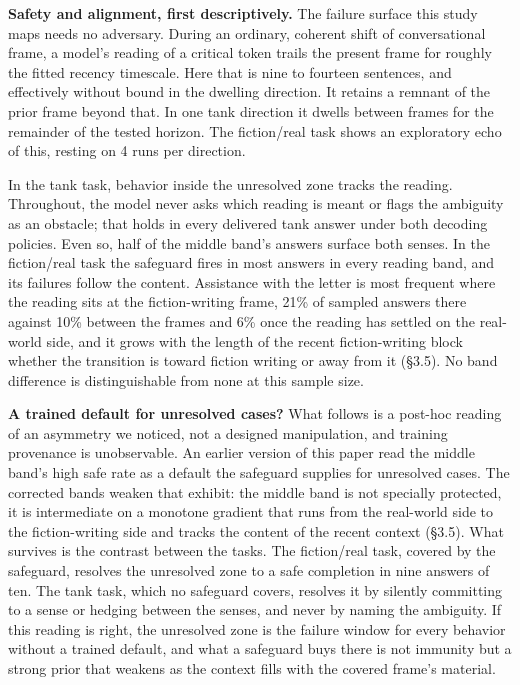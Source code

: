 \documentclass[11pt]{article}
\begin{document}
\textbf{Safety and alignment, first descriptively.} The failure surface this study maps
needs no adversary. During an ordinary, coherent shift of conversational frame, a
model's reading of a critical token trails the present frame for roughly the fitted
recency timescale. Here that is nine to fourteen sentences, and effectively without
bound in the dwelling direction. It retains a remnant of the prior frame beyond that.
In one tank direction it dwells between frames for the remainder of the tested
horizon. The fiction/real task shows an exploratory echo of this, resting on 4 runs
per direction.

In the tank task, behavior inside the unresolved zone tracks the reading. Throughout, the model never asks which reading is meant or flags the ambiguity as an obstacle; that holds in every delivered tank answer under both decoding policies. Even so, half of the middle band's answers surface both senses. In the fiction/real task the safeguard fires in most answers in every reading band, and its failures follow the content. Assistance with the letter is most frequent where the reading sits at the fiction-writing frame, 21\% of sampled answers there against 10\% between the frames and 6\% once the reading has settled on the real-world side, and it grows with the length of the recent fiction-writing block whether the transition is toward fiction writing or away from it (\S3.5). No band difference is distinguishable from none at this sample size.

\textbf{A trained default for unresolved cases?} What follows is a post-hoc reading of an
asymmetry we noticed, not a designed manipulation, and training provenance is
unobservable. An earlier version of this paper read the middle band's high safe rate as a default the safeguard supplies for unresolved cases. The corrected bands weaken that exhibit: the middle band is not specially protected, it is intermediate on a monotone gradient that runs from the real-world side to the fiction-writing side and tracks the content of the recent context (\S3.5). What survives is the contrast between the tasks. The fiction/real task, covered by the safeguard, resolves the unresolved zone to a safe completion in nine answers of ten. The tank task, which no safeguard covers, resolves it by silently committing to a sense or hedging between the senses, and never by naming the ambiguity. If this reading is right, the unresolved zone is the failure window for every behavior without a trained default, and what a safeguard buys there is not immunity but a strong prior that weakens as the context fills with the covered frame's material.
\end{document}
